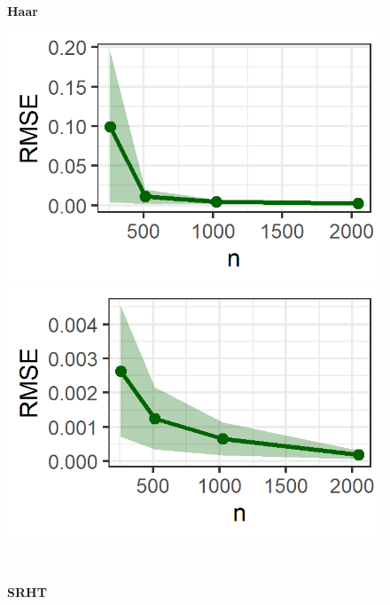 \begin{figure}[ht]
\begin{minipage}[c]{0.76\textwidth}
\end{minipage} \\
\begin{minipage}[c]{0.21\textwidth}
\hfill \textbf{Haar}
\end{minipage}
\hfill
\begin{minipage}[c]{0.76\textwidth}
\includegraphics{images/rmse_sketchhaar_xi0.1.png}
\includegraphics{images/rmse_sketchhaar_xi0.2.png}
\end{minipage} \\
\begin{minipage}[c]{0.21\textwidth}
\hfill \textbf{SRHT}
\end{minipage}
\hfill
\begin{minipage}[c]{0.76\textwidth}

\end{minipage}
\end{figure}
